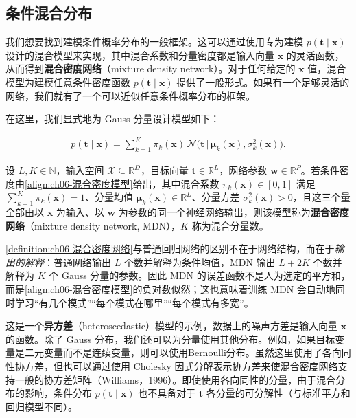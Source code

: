 \documentclass[../../main.tex]{subfiles}
\begin{document}
\subsection{条件混合分布}\label{subsection:ch06-条件混合分布}

我们想要找到建模条件概率分布的一般框架。这可以通过使用专为建模 $p(\boldsymbol{t}\mid\boldsymbol{x})$ 设计的混合模型来实现，其中混合系数和分量密度都是输入向量 $\boldsymbol{x}$ 的灵活函数，从而得到\textbf{混合密度网络}（mixture density network）。对于任何给定的 $\boldsymbol{x}$ 值，混合模型为建模任意条件密度函数 $p(\boldsymbol{t}\mid\boldsymbol{x})$ 提供了一般形式。如果有一个足够灵活的网络，我们就有了一个可以近似任意条件概率分布的框架。

在这里，我们显式地为 Gauss 分量设计模型如下：

\begin{align}
p(\boldsymbol{t}\mid\boldsymbol{x})=\sum_{k=1}^{K}\pi_k(\boldsymbol{x})\,\mathcal{N}\bigl(\boldsymbol{t}\,\big|\,\boldsymbol{\mu}_k(\boldsymbol{x}),\sigma_k^{2}(\boldsymbol{x})\bigr).
\label{align:ch06-混合密度模型}
\end{align}

\begin{definition}[混合密度网络]\label{definition:ch06-混合密度网络}
设 $L,K\in\mathbb{N}$，输入空间 $\mathcal{X}\subseteq\mathbb{R}^{D}$，目标向量 $\boldsymbol{t}\in\mathbb{R}^{L}$，网络参数 $\boldsymbol{w}\in\mathbb{R}^{P}$。若条件密度由\eqref{align:ch06-混合密度模型}给出，其中混合系数 $\pi_{k}(\boldsymbol{x})\in[0,1]$ 满足 $\sum_{k=1}^{K}\pi_{k}(\boldsymbol{x})=1$、分量均值 $\boldsymbol{\mu}_{k}(\boldsymbol{x})\in\mathbb{R}^{L}$、分量方差 $\sigma_{k}^{2}(\boldsymbol{x})>0$，且这三个量全部由以 $\boldsymbol{x}$ 为输入、以 $\boldsymbol{w}$ 为参数的同一个神经网络输出，则该模型称为\textbf{混合密度网络}（mixture density network, MDN），$K$ 称为混合分量数。
\end{definition}

\begin{remark}\cref{definition:ch06-混合密度网络}与普通回归网络的区别不在于网络结构，而在于\emph{输出的解释}：普通网络输出 $L$ 个数并解释为条件均值，MDN 输出 $L+2K$ 个数并解释为 $K$ 个 Gauss 分量的参数。因此 MDN 的误差函数不是人为选定的平方和，而是\eqref{align:ch06-混合密度模型}的负对数似然；这也意味着训练 MDN 会自动地同时学习“有几个模式”“每个模式在哪里”“每个模式有多宽”。
\end{remark}

这是一个\textbf{异方差}（heteroscedastic）模型的示例，数据上的噪声方差是输入向量 $\boldsymbol{x}$ 的函数。除了 Gauss 分布，我们还可以为分量使用其他分布。例如，如果目标变量是二元变量而不是连续变量，则可以使用Bernoulli分布。虽然这里使用了各向同性协方差，但也可以通过使用 Cholesky 因式分解表示协方差来使混合密度网络支持一般的协方差矩阵（Williams，1996）。即使使用各向同性的分量，由于混合分布的影响，条件分布 $p(\boldsymbol{t}\mid\boldsymbol{x})$ 也不具备对于 $\boldsymbol{t}$ 各分量的可分解性（与标准平方和回归模型不同）。
\end{document}
